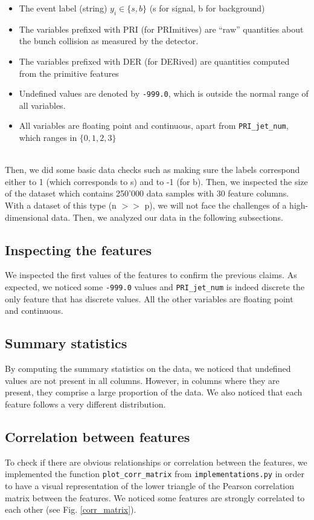 \documentclass[10pt,conference,compsocconf]{IEEEtran}
\begin{document}
\begin{itemize}

\item The event label (string) $y_i \in \{s, b\}$ (s for signal, b for background)
\item The variables prefixed with PRI (for PRImitives) are “raw” quantities about the bunch collision as measured by the detector.
\item The variables prefixed with DER (for DERived) are quantities computed from the primitive features
\item Undefined values are denoted by \texttt{-999.0}, which is outside the normal range of all variables.
\item All variables are floating point and continuous, apart from 
\texttt{PRI\_jet\_num}, which ranges in $\{0, 1, 2, 3\}$

\end{itemize}
\ \\
Then, we did some basic data checks such as making sure the labels correspond either to 1 (which corresponds to s) and to -1 (for b). Then, we inspected the size of the dataset which contains 250'000 data samples with 30 feature columns. With a dataset of this type (n $>>$ p), we will not face the challenges of a high-dimensional data. Then, we analyzed our data in the following subsections.
\ \\

\subsection{Inspecting the features} 
We inspected the first values of the features to confirm the previous claims. As expected, we noticed some \texttt{-999.0} values and \texttt{PRI\_jet\_num} is indeed discrete the only feature that has discrete values. All the other variables are floating point and continuous.
\subsection{Summary statistics} 
By computing the summary statistics on the data, we noticed that undefined values are not present in all columns. However, in columns where they are present, they comprise a large proportion of the data.
We also noticed that each feature follows a very different distribution.
\subsection{Correlation between features} 
To check if there are obvious relationships or correlation between the features, we implemented the function \texttt{plot\_corr\_matrix} from \texttt{implementations.py} in order to have a visual representation of the lower triangle of the Pearson correlation matrix between the features. We noticed some features are strongly correlated to each other (see Fig. \ref{corr_matrix}).
\end{document}
